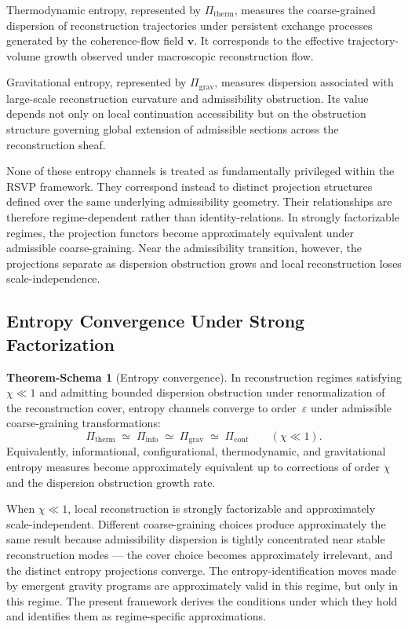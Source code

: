 \documentclass[11pt, a4paper]{article}
\theoremstyle{plain}
\theoremstyle{definition}
\newtheorem{tschema}[theorem]{Theorem-Schema}
\theoremstyle{remark}
\newcommand{\Pitherm}{\Pi_{\mathrm{therm}}}
\newcommand{\Piinfo}{\Pi_{\mathrm{info}}}
\newcommand{\Pigrav}{\Pi_{\mathrm{grav}}}
\newcommand{\Piconf}{\Pi_{\mathrm{conf}}}
\begin{document}
Thermodynamic entropy, represented by $\Pi_{\mathrm{therm}}$, measures the
coarse-grained dispersion of reconstruction trajectories under persistent exchange
processes generated by the coherence-flow field $\mathbf{v}$.  It corresponds to the
effective trajectory-volume growth observed under macroscopic reconstruction flow.

Gravitational entropy, represented by $\Pi_{\mathrm{grav}}$, measures dispersion
associated with large-scale reconstruction curvature and admissibility obstruction.
Its value depends not only on local continuation accessibility but on the obstruction
structure governing global extension of admissible sections across the reconstruction
sheaf.

None of these entropy channels is treated as fundamentally privileged within the
RSVP framework.  They correspond instead to distinct projection structures defined
over the same underlying admissibility geometry.  Their relationships are therefore
regime-dependent rather than identity-relations.  In strongly factorizable regimes,
the projection functors become approximately equivalent under admissible
coarse-graining.  Near the admissibility transition, however, the projections
separate as dispersion obstruction grows and local reconstruction loses
scale-independence.

\subsection{Entropy Convergence Under Strong Factorization}

\begin{tschema}[Entropy convergence]
\label{ts:convergence}
In reconstruction regimes satisfying $\chi \ll 1$ and admitting bounded dispersion
obstruction under renormalization of the reconstruction cover, entropy channels
converge to order~$\varepsilon$ under admissible coarse-graining transformations:
\[
  \Pitherm \;\simeq\; \Piinfo \;\simeq\; \Pigrav \;\simeq\; \Piconf
  \qquad (\chi \ll 1).
\]
Equivalently, informational, configurational, thermodynamic, and gravitational
entropy measures become approximately equivalent up to corrections of order $\chi$
and the dispersion obstruction growth rate.
\end{tschema}

When $\chi \ll 1$, local reconstruction is strongly factorizable and approximately
scale-independent. Different coarse-graining choices produce approximately the same
result because admissibility dispersion is tightly concentrated near stable
reconstruction modes --- the cover choice becomes approximately irrelevant, and the
distinct entropy projections converge. The entropy-identification moves made by
emergent gravity programs are approximately valid in this regime, but only in this
regime. The present framework derives the conditions under which they hold and
identifies them as regime-specific approximations.
\end{document}
